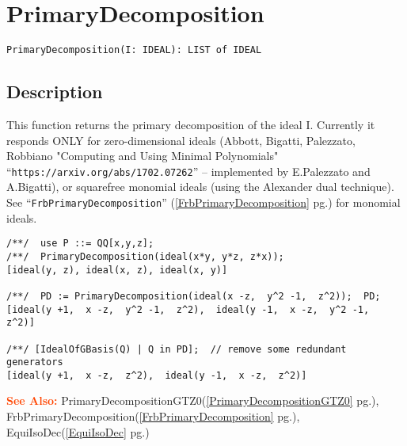\documentclass[a4paper]{mybook}
\newenvironment{command}{}{} %
\newcommand\SeeAlso{\par\textcolor{OrangeRed}{\textbf{\large See Also: }}}
\begin{document}
\section{PrimaryDecomposition}
\label{PrimaryDecomposition}
\begin{command} %


\begin{Verbatim}[label=syntax, rulecolor=\color{MidnightBlue},
frame=single]
PrimaryDecomposition(I: IDEAL): LIST of IDEAL
\end{Verbatim}


\subsection*{Description}

This function returns the primary decomposition of the ideal I.
Currently it responds ONLY for zero-dimensional ideals
(Abbott, Bigatti, Palezzato, Robbiano
"Computing and Using Minimal Polynomials"
``\verb&https://arxiv.org/abs/1702.07262&''
-- implemented by E.Palezzato and A.Bigatti),
or squarefree monomial ideals (using the Alexander dual technique).
See ``\verb&FrbPrimaryDecomposition&'' (\ref{FrbPrimaryDecomposition} pg.\pageref{FrbPrimaryDecomposition}) for monomial ideals.
\begin{Verbatim}[label=example, rulecolor=\color{PineGreen}, frame=single]
/**/  use P ::= QQ[x,y,z];
/**/  PrimaryDecomposition(ideal(x*y, y*z, z*x));
[ideal(y, z), ideal(x, z), ideal(x, y)]

/**/  PD := PrimaryDecomposition(ideal(x -z,  y^2 -1,  z^2));  PD;
[ideal(y +1,  x -z,  y^2 -1,  z^2),  ideal(y -1,  x -z,  y^2 -1,  z^2)]

/**/ [IdealOfGBasis(Q) | Q in PD];  // remove some redundant generators
[ideal(y +1,  x -z,  z^2),  ideal(y -1,  x -z,  z^2)]
\end{Verbatim}


\SeeAlso %
  PrimaryDecompositionGTZ0(\ref{PrimaryDecompositionGTZ0} pg.\pageref{PrimaryDecompositionGTZ0}), 
    FrbPrimaryDecomposition(\ref{FrbPrimaryDecomposition} pg.\pageref{FrbPrimaryDecomposition}), 
    EquiIsoDec(\ref{EquiIsoDec} pg.\pageref{EquiIsoDec})
\end{command} %
\end{document}
